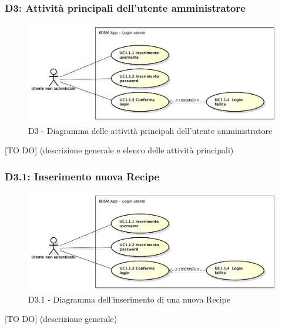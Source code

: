 		\subsubsection{D3: Attività principali dell'utente amministratore} %
		\label{ssub:attivita_principali_dell_utente_amministratore}
		\begin{figure}[!htbp]
			\centering
			\centerline{\includegraphics[scale=0.45]{./images/UC1_1.pdf}}
			\caption{D3 - Diagramma delle attività principali dell'utente amministratore}
		\end{figure}
		[TO DO] (descrizione generale e elenco delle attività principali)



		\subsubsection{D3.1: Inserimento nuova Recipe} %
		\label{ssub:inserimento_nuova_recipe}
		\begin{figure}[!htbp]
			\centering
			\centerline{\includegraphics[scale=0.45]{./images/UC1_1.pdf}}
			\caption{D3.1 - Diagramma dell'inserimento di una nuova Recipe}
		\end{figure}
		[TO DO] (descrizione generale)


